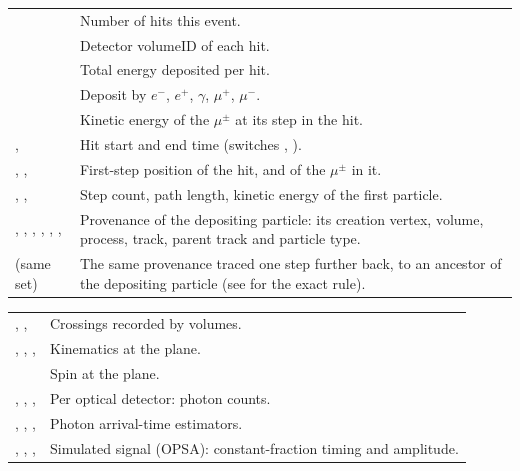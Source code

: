{\tablestyle
\begin{tabularx}{\textwidth}{@{}>{\raggedright\arraybackslash}p{} L@{}}
\toprule
{} & Number of hits this event.\\
 & Detector volumeID of each hit.\\
 & Total energy deposited per hit.\\
 & Deposit by \(e^-\), \(e^+\), \(\gamma\), \(\mu^+\), \(\mu^-\).\\
 & Kinetic energy of the \(\mu^\pm\) at its step in the hit.\\
,  & Hit start and end time (switches , ).\\
, ,  & First-step position of the hit, and of the \(\mu^\pm\) in it.\\
, ,  & Step count, path length, kinetic energy of the first particle.\\
, , , , , ,  & Provenance of the depositing particle: its creation vertex, volume, process, track, parent track and particle type.\\
 (same set) & The same provenance traced one step further back, to an ancestor of the depositing particle (see  for the exact rule).\\
\bottomrule
\end{tabularx}}

{\tablestyle
\begin{tabularx}{\textwidth}{@{}>{\raggedright\arraybackslash}p{} L@{}}
\toprule
{}, ,  & Crossings recorded by  volumes.\\
, , ,  & Kinematics at the plane.\\
 & Spin at the plane.\\
, , ,  & Per optical detector: photon counts.\\
, , ,  & Photon arrival-time estimators.\\
, , ,  & Simulated signal (OPSA): constant-fraction timing and amplitude.\\
\bottomrule
\end{tabularx}}
